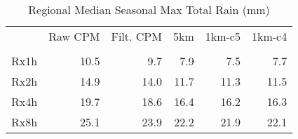 \begin{table}[ht!]
\caption{Regional Median Seasonal Max Total Rain (mm)}
\label{tab:max_rain}
\begin{tabular}{lrrrrr}
\toprule
 & Raw CPM & Filt. CPM & 5km & 1km-c5 & 1km-c4 \\
 &  &  &  &  &  \\
\midrule
Rx1h & 10.5 & 9.7 & 7.9 & 7.5 & 7.7 \\
Rx2h & 14.9 & 14.0 & 11.7 & 11.3 & 11.5 \\
Rx4h & 19.7 & 18.6 & 16.4 & 16.2 & 16.3 \\
Rx8h & 25.1 & 23.9 & 22.2 & 21.9 & 22.1 \\
\bottomrule
\end{tabular}
\end{table}
